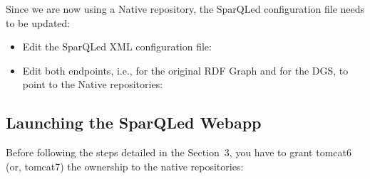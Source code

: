 Since we are now using a Native repository, the SparQLed configuration file needs to be updated:
\begin{itemize}
\item Edit the SparQLed XML configuration file:

\bigskip
\begin{raggedleft}
\end{raggedleft}

\item Edit both endpoints, i.e., for the original RDF Graph and for the DGS, to point to the Native repositories:

\bigskip
\begin{raggedleft}
\end{raggedleft}

\bigskip
\begin{raggedleft}
\end{raggedleft}
\end{itemize}

\subsection{Launching the SparQLed Webapp}

Before following the steps detailed in the Section~3, you have to grant tomcat6 (or, tomcat7) the ownership to the native repositories:

\bigskip
\begin{raggedleft}
\end{raggedleft}

